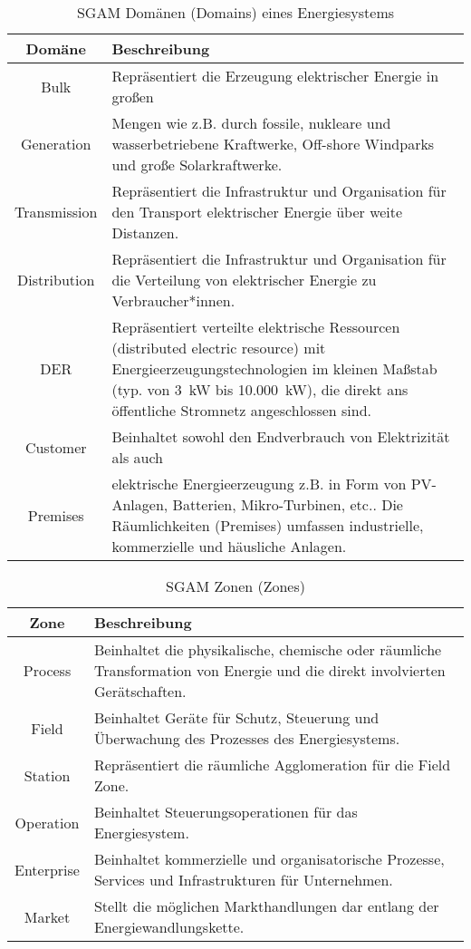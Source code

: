 		\begin{table}
			\begin{tabularx}{\linewidth}{|c|X|}
				\hline 
				\textbf{Domäne} 				& \textbf{Beschreibung}   \\ 
				\hline 
				Bulk 				& Repräsentiert die Erzeugung elektrischer Energie in großen \\
				Generation			&  Mengen wie z.B. durch fossile, nukleare und wasserbetriebene Kraftwerke, Off-shore Windparks und große Solarkraftwerke. \\
				\hline 
				Transmission 		& Repräsentiert die Infrastruktur und Organisation für den Transport elektrischer Energie über weite Distanzen. \\
				\hline
				Distribution		& Repräsentiert die Infrastruktur und Organisation für die Verteilung von elektrischer Energie zu Verbraucher*innen. \\
				\hline
				DER		 			& Repräsentiert verteilte elektrische Ressourcen (distributed electric resource) mit Energieerzeugungstechnologien im kleinen Maßstab (typ. von 3~kW bis 10.000~kW), die direkt ans öffentliche Stromnetz angeschlossen sind. \\
				\hline
				Customer 			& Beinhaltet sowohl den Endverbrauch von Elektrizität als auch  \\
				Premises			& elektrische Energieerzeugung z.B. in Form von PV-Anlagen, Batterien, Mikro-Turbinen, etc.. Die Räumlichkeiten (Premises) umfassen industrielle, kommerzielle und häusliche Anlagen.\\
				\hline 
			\end{tabularx}
			\caption{SGAM Domänen (Domains) eines Energiesystems}
			\label{Tab:SGAM_Domains}
		\end{table}	
		

		\begin{table}
			\begin{tabularx}{\linewidth}{|c|X|}
				\hline 
				\textbf{Zone} & \textbf{Beschreibung}   \\ 
				\hline 
				Process 	& Beinhaltet die physikalische, chemische oder räumliche Transformation von Energie und die direkt involvierten Gerätschaften. \\ 
				\hline 
				Field 		&  Beinhaltet Geräte für Schutz, Steuerung und Überwachung des Prozesses des Energiesystems. \\
				\hline
				Station 	& Repräsentiert die räumliche Agglomeration für die Field Zone. \\
				\hline
				Operation 	& Beinhaltet Steuerungsoperationen für das Energiesystem. \\
				\hline
				Enterprise 	& Beinhaltet kommerzielle und organisatorische Prozesse, Services und Infrastrukturen für Unternehmen. \\
				\hline
				Market 		& Stellt die möglichen Markthandlungen dar entlang der Energiewandlungskette.\\
				\hline 
			\end{tabularx} 
			\caption{SGAM Zonen (Zones)}
			\label{Tab:SGAM_Zones}
		\end{table}	
					
